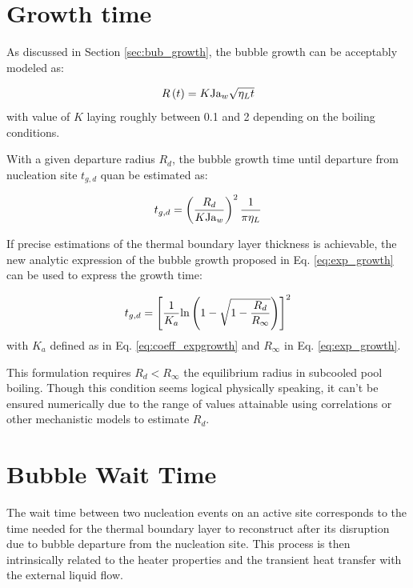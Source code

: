 \section{Growth time}
\label{sec:growth_time}


As discussed in Section \ref{sec:bub_growth}, the bubble growth can be acceptably modeled as:

\begin{equation}
R\left( t \right) = K\mathrm{Ja}_{w} \sqrt{\eta_{L}t}
\end{equation}
with value of $K$ laying roughly between 0.1 and 2 depending on the boiling conditions.

\npar

With a given departure radius $R_{d}$, the bubble growth time until departure from nucleation site $t_{g,d}$ quan be estimated as:

\begin{equation}
t_{g,d} = \left( \frac{R_{d}}{K \mathrm{Ja}_{w}} \right)^{2} \frac{1}{\pi \eta_{L}}
\label{eq:tg_dep}
\end{equation}

\begin{note*}{}
If precise estimations of the thermal boundary layer thickness is achievable, the new analytic expression of the bubble growth proposed in Eq. \ref{eq:exp_growth} can be used to express the growth time:

\begin{equation}
t_{g,d} = \left[ \frac{1}{K_{a}} \mathrm{ln}\left( 1-\sqrt{1-\dfrac{R_{d}}{R_{\infty}}}  \right)  \right]^{2}
\end{equation}
with $K_{a}$ defined as in Eq. \ref{eq:coeff_expgrowth} and $R_{\infty}$ in Eq. \ref{eq:exp_growth}.

\npar
This formulation requires $R_{d} < R_{\infty}$ the equilibrium radius in subcooled pool boiling. Though this condition seems logical physically speaking, it can't be ensured numerically due to the range of values attainable using correlations or other mechanistic models to estimate $R_{d}$.
\end{note*}



\section{Bubble Wait Time}
\label{sec:wait_time}

The wait time between two nucleation events on an active site corresponds to the time needed for the thermal boundary layer to reconstruct after its disruption due to bubble departure from the nucleation site. This process is then intrinsically related to the heater properties and the transient heat transfer with the external liquid flow.



